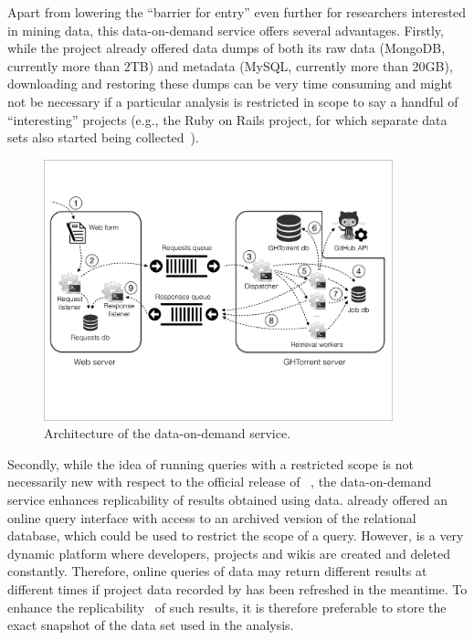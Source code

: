 Apart from lowering the ``barrier for entry'' even further for researchers interested in mining \gh data,
this data-on-demand service offers several advantages.
Firstly, while the \ght project already offered data dumps of both its raw data (MongoDB, currently more than 2TB) 
and metadata (MySQL, currently more than 20GB), downloading and restoring these dumps can be 
very time consuming and might not be necessary if a particular analysis is restricted in scope to say a handful
of ``interesting'' \gh projects (e.g., the Ruby on Rails project, for which separate data sets also started being 
collected~\cite{wagstrom2013network}).

\begin{figure}[t]
\begin{center}
\includegraphics[width=0.9\textwidth, trim=5 160 5 105, clip=True]{figures/architecture.pdf}
\caption{Architecture of the \ght data-on-demand service.}
\label{fig:architecture}
\end{center}
\end{figure}

Secondly, while the idea of running queries with a restricted scope is not necessarily new with respect to
the official release of \linebreak \ght~\cite{gousios2013ghtorent}, the data-on-demand service enhances replicability
of results obtained using \ght data. 
\ght already offered an online query interface with access to an archived version of the relational database, 
which could be used to restrict the scope of a query.
However, \gh is a very dynamic platform where developers, projects and wikis are created and deleted constantly.
Therefore, online queries of \ght data may return different results at different times if project data recorded
by \ght has been refreshed in the meantime.
To enhance the replicability~\cite{gonzalez2012reproducibility} of such results, it is therefore preferable to 
store the exact snapshot of the data set used in the analysis.

